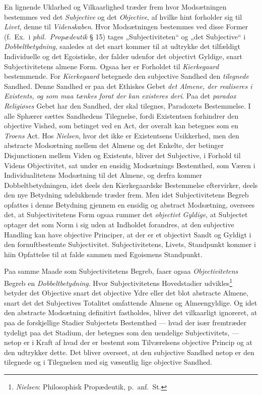 \documentclass[12pt,a4paper]{book}
\newcommand{\opage}[1]{\marginnote{\footnotesize\textit{[#1]}}}
\begin{document}
En lignende Uklarhed og Vilkaarlighed træder frem hvor Modsætningen bestemmes ved det \emph{Subjective} og det \emph{Objective}, af hvilke hint forholder sig til \emph{Livet}, denne til \emph{Videnskaben}. Hvor Modsætningen bestemmes ved \opage{132}disse Former (f.\ Ex.\ i \emph{phil.\ Propædeutik}
§ 15) tages „Subjectiviteten“ og „det Subjective“ i \emph{Dobbeltbetydning}, saaledes at
det snart kommer til at udtrykke det tilfældigt Individuelle og det Egoistiske, der falder
udenfor det objectivt Gyldige, snart Subjectivitetens almene Form. Ogsaa her er Forholdet
til \emph{Kierkegaard} bestemmende. For \emph{Kierkegaard} betegnede den subjective Sandhed den \emph{tilegnede} Sandhed. Denne Sandhed er paa det Ethiskes Gebet \emph{det Almene, der realiseres i Existents, og som maa tænkes forat der kan existeres deri}. Paa det \emph{paradox Religiøses}
Gebet har den Sandhed, der skal tilegnes, Paradoxets Bestemmelse. I alle Sphærer sættes
Sandhedens Tilegnelse, fordi Existentsen forhindrer den objective Vished, som betinget ved
en Act, der overalt kan betegnes som en \emph{Troens} Act. Hos \emph{Nielsen}, hvor det ikke er
Existentsens Usikkerhed, men den abstracte Modsætning mellem det Almene og det Enkelte, der
betinger Disjunctionen mellem Viden og Existents, bliver det Subjective, i Forhold til
Videns Objectivitet, sat under en ensidig Modsætnings Bestemthed, som Væren i
Individualitetens Modsætning til det Almene, og derfra kommer Dobbeltbetydningen, idet
deels den Kierkegaardske Bestemmelse eftervirker, deels den nye Betydning udelukkende
træder frem. Men idet Subjectivitetens Begreb opfattes i denne Betydning gjennem en ensidig
og abstract Modsætning, oversees det, at Subjectivitetens Form ogsaa rummer det \emph{objectivt Gyldige}, at Subjectet optager det som Norm i sig uden at Indholdet forandres, at den subjective Handling kan have objective Principer, at der er et objectivt Sandt og Gyldigt i den fornuftbestemte Subjectivitet. Subjectivitetens, Livets, Standpunkt kommer i hiin Opfattelse til at falde sammen med Egoismens Standpunkt.

Paa samme Maade som Subjectivitetens Begreb, faaer ogsaa \emph{Objectivitetens} Begreb en \emph{Dobbeltbetydning}. Hvor Subjectivitetens Hovedstadier udvikles\footnote{\emph{Nielsen}: Philosophisk Propædeutik, p.\ anf.\ St.} betyder det \opage{133}Objective snart det objective Ydre
eller det blot abstracte Almene, snart det det Subjectives Totalitet omfattende Almene og
Almeengyldige. Og idet den abstracte Modsætning definitivt fastholdes, bliver det
vilkaarligt ignoreret, at paa de forskjellige Stadier Subjectets Bestemthed --- hvad der
især fremtræder tydeligt paa det Stadium, der betegnes som den uendelige Subjectivitets,
--- netop er i Kraft af hvad der er bestemt som Tilværelsens objective Princip og at den
udtrykker dette. Det bliver overseet, at den subjective Sandhed netop er den tilegnede og i Tilegnelsen med sig væsentlig lige objective Sandhed.
\end{document}
